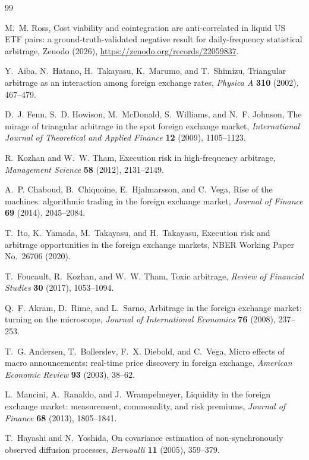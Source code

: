 \documentclass[11pt]{article}
\begin{document}
\begin{thebibliography}{99}

 M.~M. Ross, Cost viability and cointegration are
anti-correlated in liquid US ETF pairs: a ground-truth-validated
negative result for daily-frequency statistical arbitrage, Zenodo
(2026), \url{https://zenodo.org/records/22059837}.

 Y.~Aiba, N.~Hatano, H.~Takayasu, K.~Marumo, and
T.~Shimizu, Triangular arbitrage as an interaction among foreign
exchange rates, \emph{Physica A} \textbf{310} (2002), 467--479.

 D.~J. Fenn, S.~D. Howison, M.~McDonald, S.~Williams,
and N.~F. Johnson, The mirage of triangular arbitrage in the spot
foreign exchange market, \emph{International Journal of Theoretical and
Applied Finance} \textbf{12} (2009), 1105--1123.

 R.~Kozhan and W.~W. Tham, Execution risk in
high-frequency arbitrage, \emph{Management Science} \textbf{58} (2012),
2131--2149.

 A.~P. Chaboud, B.~Chiquoine, E.~Hjalmarsson, and
C.~Vega, Rise of the machines: algorithmic trading in the foreign
exchange market, \emph{Journal of Finance} \textbf{69} (2014),
2045--2084.

 T.~Ito, K.~Yamada, M.~Takayasu, and H.~Takayasu,
Execution risk and arbitrage opportunities in the foreign exchange
markets, NBER Working Paper No.~26706 (2020).

 T.~Foucault, R.~Kozhan, and W.~W. Tham, Toxic
arbitrage, \emph{Review of Financial Studies} \textbf{30} (2017),
1053--1094.

 Q.~F. Akram, D.~Rime, and L.~Sarno, Arbitrage in
the foreign exchange market: turning on the microscope, \emph{Journal
of International Economics} \textbf{76} (2008), 237--253.

 T.~G. Andersen, T.~Bollerslev, F.~X. Diebold,
and C.~Vega, Micro effects of macro announcements: real-time price
discovery in foreign exchange, \emph{American Economic Review}
\textbf{93} (2003), 38--62.

 L.~Mancini, A.~Ranaldo, and J.~Wrampelmeyer,
Liquidity in the foreign exchange market: measurement, commonality, and
risk premiums, \emph{Journal of Finance} \textbf{68} (2013),
1805--1841.

 T.~Hayashi and N.~Yoshida, On covariance
estimation of non-synchronously observed diffusion processes,
\emph{Bernoulli} \textbf{11} (2005), 359--379.


\end{thebibliography}
\end{document}

